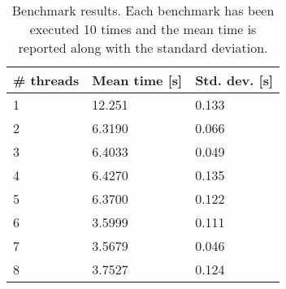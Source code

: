 \documentclass[11pt,a4paper,oneside]{book}
\begin{document}
	\begin{table}[!ht]
		\begin{tabular}{|l|l|l|}
			\hline
			\# threads & Mean time {[}s{]} & Std. dev. {[}s{]} \\ \hline
			1          & 12.251            & 0.133             \\ \hline
			2          & 6.3190            & 0.066             \\ \hline
			3          & 6.4033            & 0.049             \\ \hline
			4          & 6.4270            & 0.135             \\ \hline
			5          & 6.3700            & 0.122             \\ \hline
			6          & 3.5999            & 0.111             \\ \hline
			7          & 3.5679            & 0.046             \\ \hline
			8          & 3.7527            & 0.124             \\ \hline
		\end{tabular}
		\caption{Benchmark results. Each benchmark has been executed 10 times and the mean time is reported along with the standard deviation.}
		\label{benchmark-results}
	\end{table}
	
\end{document}
